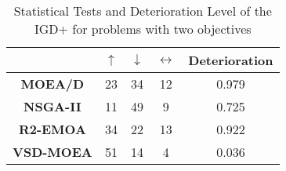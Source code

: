 \begin{table}[t]
\caption{Statistical Tests and Deterioration Level of the IGD+ for problems with two objectives}
\label{tab:Tests_IGDP_2obj}
\centering
\begin{scriptsize}
\begin{tabular}{c c|c|c|c}
\cline{2-5}
                                        & \textbf{$\uparrow$} & \textbf{$\downarrow$} & \textbf{$\leftrightarrow$} & \textbf{Deterioration} \\ \hline
\multicolumn{1}{c|}{\textbf{MOEA/D}}   & 23                  & 34                    & 12                         & 0.979         \\ \hline
\multicolumn{1}{c|}{\textbf{NSGA-II}}  & 11                  & 49                    & 9                          & 0.725         \\ \hline
\multicolumn{1}{c|}{\textbf{R2-EMOA}}  & 34                  & 22                    & 13                         & 0.922         \\ \hline
\multicolumn{1}{c|}{\textbf{VSD-MOEA}} & 51                  & 14                    & 4                          & 0.036         \\ \hline
\end{tabular}%
\end{scriptsize}
\end{table}

